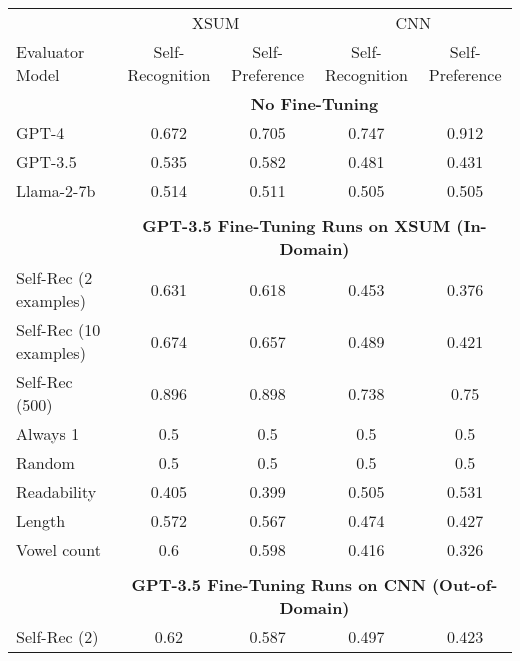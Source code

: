 \begin{table}[h]
    \centering
    \begin{tabular}{l|cccc}
                                           & \multicolumn{2}{c}{XSUM} & \multicolumn{2}{c}{CNN}\\ 
        Evaluator Model                    & Self-Recognition & Self-Preference & Self-Recognition & Self-Preference \\
        \hline
        & \multicolumn{4}{c}{\textbf{No Fine-Tuning}} \\
        GPT-4                              & 0.672       & 0.705       & 0.747       & 0.912       \\
        GPT-3.5                            & 0.535       & 0.582       & 0.481       & 0.431       \\
        Llama-2-7b                         & 0.514       & 0.511       & 0.505       & 0.505       \\
        \multicolumn{5}{c}{} \\
        \multicolumn{1}{c}{} & \multicolumn{4}{c}{\textbf{GPT-3.5 Fine-Tuning Runs on XSUM (In-Domain)}} \\
        Self-Rec (2 examples)              & 0.631       & 0.618       & 0.453       & 0.376       \\
        Self-Rec (10 examples)             & 0.674       & 0.657       & 0.489       & 0.421       \\
        Self-Rec (500)                     & 0.896       & 0.898       & 0.738       & 0.75        \\
        Always 1                           & 0.5         & 0.5         & 0.5         & 0.5         \\
        Random                             & 0.5         & 0.5         & 0.5         & 0.5         \\
        Readability                        & 0.405       & 0.399       & 0.505       & 0.531       \\
        Length                             & 0.572       & 0.567       & 0.474       & 0.427       \\
        Vowel count                        & 0.6         & 0.598       & 0.416       & 0.326       \\
        \multicolumn{5}{c}{} \\
        \multicolumn{1}{c}{} & \multicolumn{4}{c}{\textbf{GPT-3.5 Fine-Tuning Runs on CNN (Out-of-Domain)}} \\
        Self-Rec (2)                       & 0.62        & 0.587       & 0.497       & 0.423       \\

\end{tabular}
\end{table}
